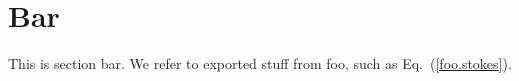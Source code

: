 \section{Bar}
This is section bar.
We refer to exported stuff from foo, such as Eq.~(\ref{foo.stokes}).
